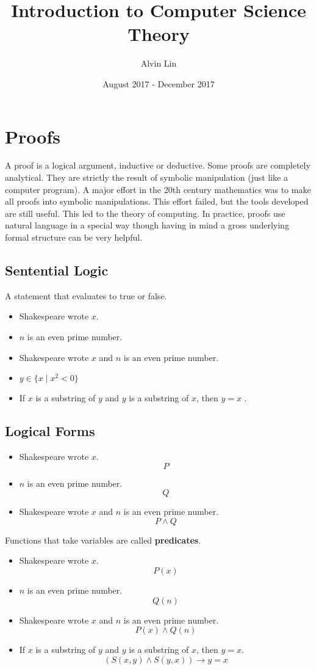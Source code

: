 \documentclass{math}
\title{Introduction to Computer Science Theory}
\author{Alvin Lin}
\date{August 2017 - December 2017}
\begin{document}
\maketitle

\section*{Proofs}
A proof is a logical argument, inductive or deductive. Some proofs are
completely analytical. They are strictly the result of symbolic manipulation
(just like a computer program). A major effort in the 20th century mathematics
was to make all proofs into symbolic manipulations. This effort failed, but the
tools developed are still useful. This led to the theory of computing. In
practice, proofs use natural language in a special way though having in mind
a gross underlying formal structure can be very helpful.

\subsection*{Sentential Logic}
A statement that evaluates to true or false.
\begin{itemize}
  \item Shakespeare wrote \( x \).
  \item \( n \) is an even prime number.
  \item Shakespeare wrote \( x \) and \( n \) is an even prime number.
  \item \( y\in\{x\mid x^2<0\} \)
  \item If \( x \) is a substring of \( y \) and \( y \) is a substring of
    \( x \), then \( y = x \) .
\end{itemize}

\subsection*{Logical Forms}
\begin{itemize}
  \item Shakespeare wrote \( x \).
    \[ P \]
  \item \( n \) is an even prime number.
    \[ Q \]
  \item Shakespeare wrote \( x \) and \( n \) is an even prime number.
    \[ P\wedge Q \]
\end{itemize}
Functions that take variables are called \textbf{predicates}.
\begin{itemize}
  \item Shakespeare wrote \( x \).
    \[ P(x) \]
  \item \( n \) is an even prime number.
    \[ Q(n) \]
  \item Shakespeare wrote \( x \) and \( n \) is an even prime number.
    \[ P(x)\wedge Q(n) \]
  \item If \( x \) is a substring of \( y \) and \( y \) is a substring of
    \( x \), then \( y = x \).
    \[ (S(x,y)\wedge S(y,x))\to y = x \]
\end{itemize}
\end{document}
